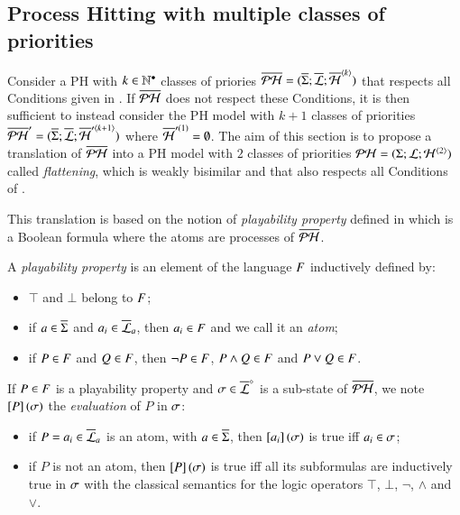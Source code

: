 \subsection{Process Hitting with multiple classes of priorities}
\label{ssec:flattening}

Consider a PH with $k \in \mathbb{N}^\bullet$ classes of priories
$\overline{\mathcal{PH}} = (\overline{\Sigma}; \overline{\mathcal{L}}; \overline{\mathcal{H}}^{{\langle k \rangle}})$
that respects all Conditions given in .
If $\overline{\mathcal{PH}}$ does not respect these Conditions,
it is then sufficient to instead consider the PH model with $k+1$ classes of priorities
$\overline{\mathcal{PH}}' = (\overline{\Sigma}; \overline{\mathcal{L}}; \overline{\mathcal{H}}'^{{\langle k+1 \rangle}})$
where $\overline{\mathcal{H}}'^{(1)} = \emptyset$.
The aim of this section is to propose a translation of $\overline{\mathcal{PH}}$
into a PH model with $2$ classes of priorities $\mathcal{PH} = (\Sigma; \mathcal{L}; \mathcal{H}^{{\langle 2 \rangle}})$
called \emph{flattening},
which is weakly bisimilar
and that also respects all Conditions of .

This translation is based on the notion of \emph{playability property} defined in 
which is a Boolean formula where the atoms are processes of $\overline{\mathcal{PH}}$.

\begin{definition}
  \label{def:pp}
  A \emph{playability property} is an element of the language $F$ inductively defined by:
  \begin{itemize}
    \item $\top$ and $\bot$ belong to $F$;
    \item if $a \in \overline{\Sigma}$ and $a_i \in \overline{\mathcal{L}}_a$, then $a_i \in F$ and we call it an \emph{atom};
    \item if $P \in F$ and $Q \in F$, then $\neg P \in F$, $P \wedge Q \in F$ and $P \vee Q \in F$.
  \end{itemize}
  If $P \in F$ is a playability property and $\sigma \in \overline{\mathcal{L}}^\diamond$ is a sub-state of $\overline{\mathcal{PH}}$,
  we note $\left[P\right](\sigma)$ the \emph{evaluation} of $P$ in $\sigma$:
  \begin{itemize}
    \item if $P = a_i \in \overline{\mathcal{L}}_a$ is an atom, with $a \in \overline{\Sigma}$, then $\left[a_i\right](\sigma)$ is true iff $a_i \in \sigma$;
    \item if $P$ is not an atom, then $\left[P\right](\sigma)$ is true iff all its subformulas are inductively true in $\sigma$
      with the classical semantics for the logic operators $\top$, $\bot$, $\neg$, $\wedge$ and $\vee$.
  \end{itemize}
\end{definition}

